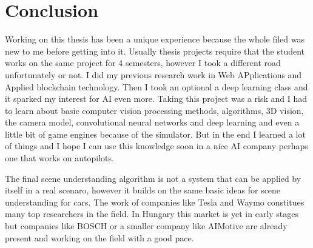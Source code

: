 \chapter{Conclusion}
\label{chap:conclusion}

Working on this thesis has been a unique experience because the whole filed
was new to me before getting into it. Usually thesis projects require that the
student works on the same project for 4 semesters, however I took a different
road unfortunately or not. I did my previous research work in Web APplications
and Applied blockchain technology. Then I took an optional a deep learning class
and it sparked my interest for AI even more. Taking this project was a risk and
I had to learn about basic computer vision processing methods, algorithms, 3D
vision, the camera model, convolutional neural networks and deep learning and
even a little bit of game engines because of the simulator. But in the end I
learned a lot of things and I hope I can use this knowledge soon in a nice AI
company perhaps one that works on autopilots.

The final scene understanding algorithm is not a system that can be applied by
itself in a real scenaro, however it builds on the same basic ideas for scene
understanding for cars. The work of companies like Tesla and Waymo constitues
many top researchers in the field. In Hungary this market is yet in early
stages but companies like BOSCH or a smaller company like AIMotive are already
present and working on the field with a good pace.